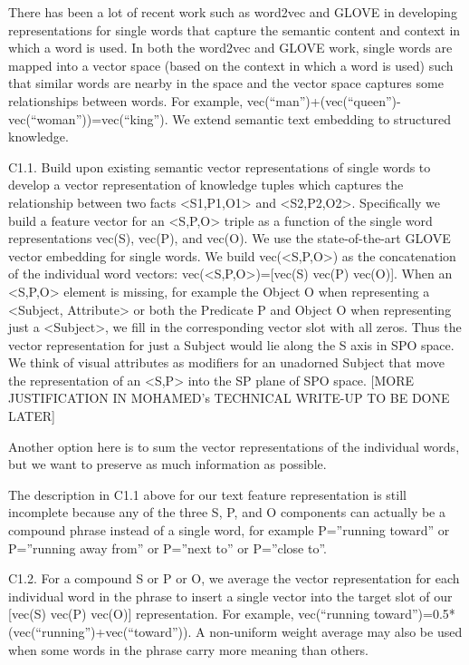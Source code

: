 \documentclass[runningheads]{llncs}
\begin{document}
There has been a lot of recent work such as word2vec and GLOVE in developing representations for single words that capture the semantic content and context in which a word is used. In both the word2vec and GLOVE work, single words are mapped into a vector space (based on the context in which a word is used) such that similar words are nearby in the space and the vector space captures some relationships between words. For example, vec(“man”)+(vec(“queen”)-vec(“woman”))=vec(“king”). We extend semantic text embedding to structured knowledge.

C1.1. Build upon existing semantic vector representations of single words to develop a vector representation of knowledge tuples which captures the relationship between two facts <S1,P1,O1> and <S2,P2,O2>. Specifically we build a feature vector for an <S,P,O> triple as a function of  the single word representations vec(S), vec(P), and vec(O). We use the state-of-the-art GLOVE vector embedding for single words. We build vec(<S,P,O>) as the concatenation of the individual word vectors: vec(<S,P,O>)=[vec(S) vec(P) vec(O)]. When an <S,P,O> element is missing, for example the Object O when representing a <Subject, Attribute> or both the Predicate P and Object O when representing just a <Subject>, we fill in the corresponding vector slot with all zeros. Thus the vector representation for just a Subject would lie along the S axis in SPO space. We think of visual attributes as modifiers for an unadorned Subject that move the representation of an <S,P> into the SP plane of SPO space. [MORE JUSTIFICATION IN MOHAMED’s TECHNICAL WRITE-UP TO BE DONE LATER]

Another option here is to sum the vector representations of the individual words, but we want to preserve as much information as possible. 

The description in C1.1 above for our text feature representation is still incomplete because any of the three S, P, and O components can actually be a compound phrase instead of a single word, for example P=”running toward” or P=”running away from” or P=”next to” or P=”close to”. 

C1.2. For a compound S or P or O, we average the vector representation for each individual word in the phrase to insert a single vector into the target slot of our [vec(S) vec(P) vec(O)] representation. For example, vec(“running toward”)=0.5*(vec(“running”)+vec(“toward”)). A non-uniform weight average may also be used when some words in the phrase carry more meaning than others. 
\end{document}
